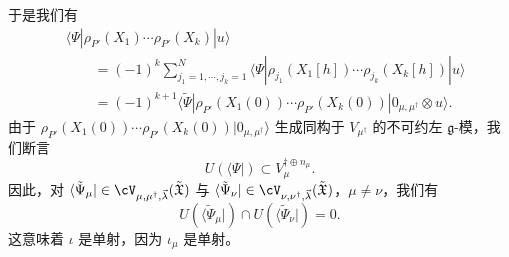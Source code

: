 于是我们有
\[
\begin{aligned}
&\langle\Psi|\rho_{P'}(X_1)\cdots\rho_{P'}(X_k)|u\rangle\\
&\qquad=(-1)^{k}\sum_{j_1=1,\cdots,j_k=1}^{N}\langle\Psi|
\rho_{j_1}(X_1[h])\cdots\rho_{j_k}(X_k[h])|u\rangle\\
&\qquad=(-1)^{k+1}\langle\tilde\Psi|\rho_{P'}(X_1(0))
\cdots\rho_{P'}(X_k(0))|0_{\mu,\mu^{\dagger}}\otimes u\rangle.
\end{aligned}
\]
由于
$\rho_{P'}(X_1(0))\cdots\rho_{P'}(X_k(0))|0_{\mu,\mu^{\dagger}}\rangle$
生成同构于 $V_{\mu^{\dagger}}$ 的不可约左 $\mathfrak{g}$-模，我们断言
\[
U(\langle\Psi|)\subset V_{\mu}^{\dagger\oplus n_\mu}.
\]
因此，对
$\langle\tilde\Psi_\mu|\in\cV_{\mu,\mu^{\dagger},\vec{\lambda}}
(\tilde{\mathfrak{X}})$ 与
$\langle\tilde\Psi_\nu|\in\cV_{\nu,\nu^{\dagger},\vec{\lambda}}
(\tilde{\mathfrak{X}})$，$\mu\ne\nu$，我们有
\[
U(\langle\tilde\Psi_\mu|)\cap U(\langle\tilde\Psi_\nu|)=0.
\]
这意味着 $\iota$ 是单射，因为 $\iota_\mu$ 是单射。

